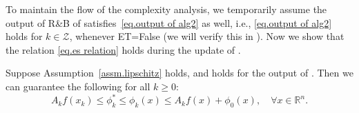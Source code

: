 \documentclass{article}
\begin{document}
To maintain the flow of the complexity analysis, we temporarily assume the output of R\&B of  satisfies~\eqref{eq.output of alg2} as well, i.e., \eqref{eq.output of alg2} holds for $k\in\mathcal{Z}$, whenever ET=False (we will verify this in ). Now we show that the relation \eqref{eq.es relation} holds during the update of .
\begin{lemma}\label{lem.estimate sequence}
    Suppose Assumption~\ref{assm.lipschitz} holds, and  holds for the output of . Then we can guarantee the following for all $k\geq 0$:
    \begin{equation}
        \label{eq.estimating sequence relation}
        A_k f(x_k)\leq \phi_k^*  \leq \phi_k(x)\leq A_k f(x)+\phi_0(x), \quad \forall x\in \mathbb{R}^n.
    \end{equation}
\end{lemma}
\end{document}
